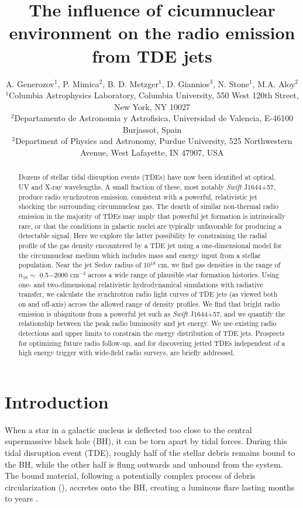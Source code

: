 \documentclass[usenatbib,fleqn]{mnras}
\title[Influence of CNM on TDE radio emission]{The influence of
  cicumnuclear environment on the radio emission from TDE jets}
\author[Generozov et al.]{ A. Generozov$^{1}$, P. Mimica$^{2}$,
  B. D. Metzger$^{1}$, D. Giannios$^{3}$, N. Stone$^{1}$,
  M.A. Aloy$^{2}$
  \\
  $^{1}$Columbia Astrophysics Laboratory, Columbia University, 550 West 120th Street, New York, NY 10027\\
  $^{2}$Departamento de Astronomia y Astrofisica, Universidad de Valencia, E-46100 Burjassot, Spain\\
  $^{3}$Department of Physics and Astronomy, Purdue University, 525
  Northwestern Avenue, West Lafayette, IN 47907, USA}
\begin{document}
\maketitle
\begin{abstract}
  Dozens of stellar tidal disruption events (TDEs) have now been
  identified at optical, UV and X-ray wavelengths.  A small fraction
  of these, most notably {\it Swift} J1644+57, produce radio
  synchrotron emission, consistent with a powerful, relativistic jet
  shocking the surrounding circumnuclear gas.  The dearth of similar
  non-thermal radio emission in the majority of TDEs may imply that
  powerful jet formation is intrinsically rare, or that the conditions
  in galactic nuclei are typically unfavorable for producing a
  detectable signal.  Here we explore the latter possibility by
  constraining the radial profile of the gas density encountered by a
  TDE jet using a one-dimensional model for the circumnuclear medium
  which includes mass and energy input from a stellar population.
  Near the jet Sedov radius of 10$^{18}$ cm, we find gas densities in
  the range of $n_{18} \sim$ 0.5$-$2000 cm$^{-3}$ across a wide range
  of plausible star formation histories.  Using one- and
  two-dimensional relativistic hydrodynamical simulations with
  radiative transfer, we calculate the synchrotron radio light curves
  of TDE jets (as viewed both on and off-axis) across the allowed
  range of density profiles.  We find that bright radio emission is
  ubiquitous from a powerful jet such as {\it Swift} J1644+57, and we
  quantify the relationship between the peak radio luminosity and jet
  energy.  We use existing radio detections and upper limits to
  constrain the energy distribution of TDE jets.  Prospects for
  optimizing future radio follow-up, and for discovering jetted TDEs
  independent of a high energy trigger with wide-field radio surveys,
  are briefly addressed.
\end{abstract}
\section{Introduction}
\label{sec:intro}
When a star in a galactic nucleus is deflected too close to the
central supermassive black hole (BH), it can be torn apart by tidal
forces.  During this tidal disruption event (TDE), roughly half of the
stellar debris remains bound to the BH, while the other half is flung
outwards and unbound from the system.  The bound material, following a
potentially complex process of debris circularization
(\citealt{Kochanek1994,Guillochon+2013,Hayasaki+2013,Hayasaki+2015,Shiokawa+2015,Bonnerot+2015}),
accretes onto the BH, creating a luminous flare lasting months to
years \citep{Hills1975, Carter+1982, Rees1988}.
\end{document}
